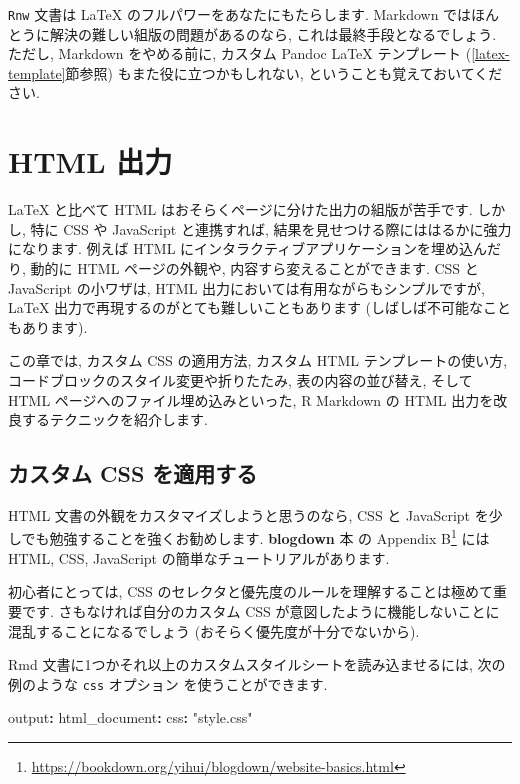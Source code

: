 \documentclass[
  11pt,
  lualatex,ja=standard,jafont=noto]{bxjsreport}
\newenvironment{Shaded}{\begin{snugshade}}{\end{snugshade}}
\newcommand{\AttributeTok}[1]{\textcolor[rgb]{0.77,0.63,0.00}{#1}}
\newcommand{\FunctionTok}[1]{\textcolor[rgb]{0.00,0.00,0.00}{#1}}
\newcommand{\KeywordTok}[1]{\textcolor[rgb]{0.13,0.29,0.53}{\textbf{#1}}}
\newcommand{\StringTok}[1]{\textcolor[rgb]{0.31,0.60,0.02}{#1}}
\renewcommand{\href}[2]{#2\footnote{\url{#1}}}
\begin{document}
\texttt{Rnw} 文書は LaTeX のフルパワーをあなたにもたらします. Markdown ではほんとうに解決の難しい組版の問題があるのなら, これは最終手段となるでしょう. ただし, Markdown をやめる前に, カスタム Pandoc LaTeX テンプレート (\ref{latex-template}節参照) もまた役に立つかもしれない, ということも覚えておいてください.

\hypertarget{html-output}{%
\chapter{HTML 出力}\label{html-output}}

LaTeX と比べて HTML はおそらくページに分けた出力の組版が苦手です. しかし, 特に CSS や JavaScript と連携すれば, 結果を見せつける際にははるかに強力になります. 例えば HTML にインタラクティブアプリケーションを埋め込んだり, 動的に HTML ページの外観や, 内容すら変えることができます. CSS と JavaScript の小ワザは, HTML 出力においては有用ながらもシンプルですが, LaTeX 出力で再現するのがとても難しいこともあります (しばしば不可能なこともあります).

この章では, カスタム CSS の適用方法, カスタム HTML テンプレートの使い方, コードブロックのスタイル変更や折りたたみ, 表の内容の並び替え, そして HTML ページへのファイル埋め込みといった, R Markdown の HTML 出力を改良するテクニックを紹介します.

\hypertarget{html-css}{%
\section{カスタム CSS を適用する}\label{html-css}}

HTML 文書の外観をカスタマイズしようと思うのなら, CSS と JavaScript を少しでも勉強することを強くお勧めします. \textbf{blogdown} 本 \autocite{blogdown2017} の \href{https://bookdown.org/yihui/blogdown/website-basics.html}{Appendix B} には HTML, CSS, JavaScript の簡単なチュートリアルがあります.

初心者にとっては, CSS のセレクタと優先度のルールを理解することは極めて重要です. さもなければ自分のカスタム CSS が意図したように機能しないことに混乱することになるでしょう (おそらく優先度が十分でないから).

Rmd 文書に1つかそれ以上のカスタムスタイルシートを読み込ませるには, 次の例のような \texttt{css} オプション を使うことができます.

\begin{Shaded}
\begin{Highlighting}[]
\FunctionTok{output}\KeywordTok{:}
\AttributeTok{  }\FunctionTok{html\_document}\KeywordTok{:}
\AttributeTok{    }\FunctionTok{css}\KeywordTok{:}\AttributeTok{ }\StringTok{"style.css"}
\end{Highlighting}
\end{Shaded}
\end{document}
